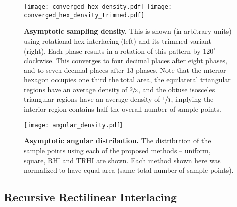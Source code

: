 \documentclass[aip, amsmath, amssymb, nobibnotes, nofootinbib, citeautoscript, reprint, superscriptaddress]{revtex4-2}
\begin{document}
    \begin{figure*}
        \texttt{[image: converged\_hex\_density.pdf]}
        \texttt{[image: converged\_hex\_density\_trimmed.pdf]}
        \caption{
            \label{fig:hexdensity}
            \textbf{Asymptotic sampling density.} 
            This is shown (in arbitrary units) using rotational hex interlacing (left) and its trimmed variant (right).
            Each phase results in a rotation of this pattern by $120^{\circ}$ clockwise.
            This converges to four decimal places after eight phases, and to seven decimal places after 13 phases.
            Note that the interior hexagon occupies one third the total area, the equilateral triangular regions have an average density of $\sfrac{2}{3}$, and the obtuse isosceles triangular regions have an average density of $\sfrac{1}{3}$, implying the interior region contains half the overall number of sample points.
            }
    \end{figure*}


    \begin{figure}
        \texttt{[image: angular\_density.pdf]}
        \caption{
        \label{fig:angdens} 
            \textbf{Asymptotic angular distribution.} The distribution of the sample points using each of the proposed methods -- uniform, square, RHI and TRHI are shown. Each method shown here was normalized to have equal area (same total number of sample points).
        }
    \end{figure}

    \subsection{\label{ssec:recursive}Recursive Rectilinear Interlacing}
\end{document}
